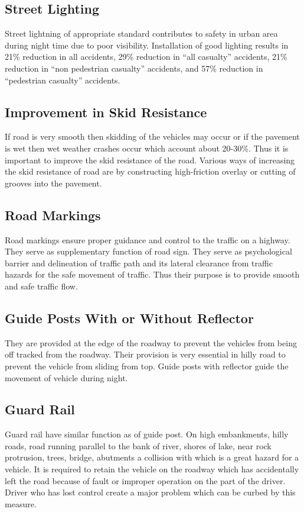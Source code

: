 \subsection{Street Lighting}
Street lightning of appropriate standard contributes to safety in urban area during night time due to poor visibility. Installation of good lighting results in 21\% reduction in all accidents, 29\% reduction in “all casualty” accidents, 21\% reduction in “non pedestrian casualty” accidents, and 57\% reduction in “pedestrian casualty” accidents.
\subsection{Improvement in Skid Resistance}
If road is very smooth then skidding of the vehicles may occur or if the pavement is wet then wet weather crashes occur which account about 20-30\%. Thus it is important to improve the skid resistance of the road. Various ways of increasing the skid resistance of road are by constructing high-friction overlay or cutting of grooves into the pavement.
\subsection{Road Markings}
Road markings ensure proper guidance and control to the traffic on a highway. They serve as supplementary function of road sign. They serve as psychological barrier and delineation of traffic path and its lateral clearance from traffic hazards for the safe movement of traffic. Thus their purpose is to provide smooth and safe traffic flow.
\subsection{Guide Posts With or Without Reflector}
They are provided at the edge of the roadway to prevent the vehicles from being off tracked from the roadway. Their provision is very essential in hilly road to prevent the vehicle from sliding from top. Guide posts with reflector guide the movement of vehicle during night.
%
\subsection{Guard Rail}
Guard rail have similar function as of guide post. On high embankments, hilly roads, road running parallel to the bank of river, shores of lake, near rock protrusion, trees, bridge, abutments a collision with which is a great hazard for a vehicle. It is required to retain the vehicle on the roadway which has accidentally left the road because of fault or improper operation on the part of the driver. Driver who has lost control create a major problem which can be curbed by this measure.
